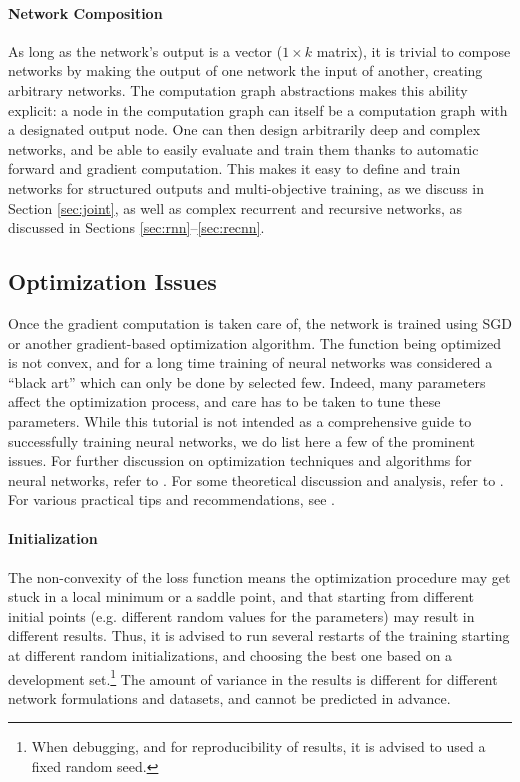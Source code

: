 \documentclass[jair,twoside,11pt,theapa]{article}
\newcommand{\ygcomment}[1]{\textbf{[TODO: #1]}}
\renewcommand{\ygcomment}[1]{}
\begin{document}
{\paragraph{Network Composition} As long as the network's output is a vector ($1
\times k$ matrix), it is trivial to compose networks by making the output of one
network the input of another, creating arbitrary networks.  The computation
graph abstractions makes this ability explicit: a node in the computation graph
can itself be a computation graph with a designated output node. 
One can then design arbitrarily deep and complex networks, and be able to easily evaluate and
train them thanks to automatic forward and gradient computation. This makes it
easy to define and train networks for structured outputs and multi-objective
training, as we discuss in Section \ref{sec:joint}, as well as complex recurrent and recursive
networks, as discussed in Sections \ref{sec:rnn}--\ref{sec:recnn}.

\subsection{Optimization Issues}
\label{sec:learning-rate}

Once the gradient computation is taken care of, the network is trained
using SGD or another gradient-based optimization
algorithm. The function being optimized is not
convex, and for a long time training of neural networks was considered a
``black art'' which can only be done by selected few.  Indeed, many parameters
affect the optimization process, and care has to be taken to tune these parameters.
While this tutorial is not intended as a comprehensive guide to successfully training
neural networks, we do list here a few of the prominent issues.  For further discussion
on optimization techniques and algorithms for neural networks, refer to
\cite[Chapter 8]{bengio2015deep}.  For some theoretical discussion and analysis,
refer to \cite{glorot2010understanding}. For various practical tips and
recommendations, see \cite{lecun1998efficient,bottou2012stochastic}.


\paragraph{Initialization} 
\label{sec:glorot-init}
The non-convexity of the loss function means the
optimization procedure may get stuck in a local minimum or a saddle point, and
that starting from different initial points (e.g. different random values for
the parameters) may result in different results. Thus, it is advised to run
several restarts of the training starting at different random initializations,
and choosing the best one based on a development set.\footnote{When debugging,
and for reproducibility of results, it is advised to used a fixed random seed.}
The amount of variance in the
results is different for different network formulations and datasets, and cannot
be predicted in advance.\ygcomment{discuss ensembles?}

}
\end{document}
